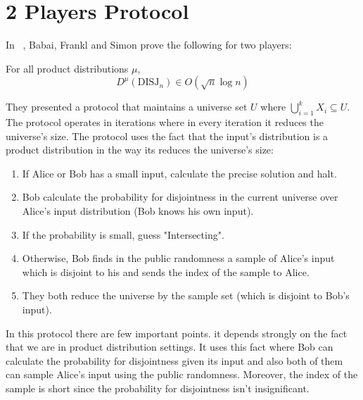 \section{2 Players Protocol}
In ~\cite{BFS86}, Babai, Frankl and Simon prove the following for two players:
\begin{theorem}
For all product distributions $\mu$, 
\begin{equation*}
    D^{\mu}(\text{DISJ}_n) \in O(\sqrt{n}\log{n})
\end{equation*}
\end{theorem}
They presented a protocol that maintains a universe set $U$ where $\bigcup_{i=1}^k X_i \subseteq U$. The protocol operates in iterations where in every iteration it reduces the universe's size. \newline
The protocol uses the fact that the input's distribution is a product distribution in the way its reduces the universe's size: \newline
\begin{enumerate}
    \item If Alice or Bob has a small input, calculate the precise solution and halt.
    \item Bob calculate the probability for disjointness in the current universe over Alice's input distribution (Bob knows his own input).
    \item If the probability is small, guess "Intersecting".
    \item Otherwise, Bob finds in the public randomness a sample of Alice's input which is disjoint to his and sends the index of the sample to Alice.
    \item They both reduce the universe by the sample set (which is disjoint to Bob's input).
\end{enumerate}
In this protocol there are few important points. it depends strongly on the fact that we are in product distribution settings. It uses this fact where Bob can calculate the probability for disjointness given its input and also both of them can sample Alice's input using the public randomness. Moreover, the index of the sample is short since the probability for disjointness isn't insignificant.
